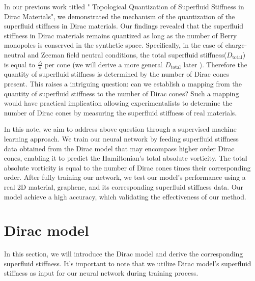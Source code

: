 \documentclass{article}
\begin{document}
In our previous work titled " Topological Quantization of Superfluid Stiffness in Dirac Materials", we demonstrated the mechanism of the quantization of the superfluid stiffness in Dirac materials. Our findings revealed that the superfluid stiffness in Dirac materials remains quantized as long as the number of Berry monopoles is conserved in the synthetic space. Specifically, in the case of charge-neutral and Zeeman field neutral conditions, the total superfluid stiffness($ D_{\textrm{total}}  $) is equal to $  \frac{\Delta}{\pi}  $  per cone (we will derive a more general $ D_{\textrm{total}} $ later ). Therefore the quantity of superfluid stiffness is determined by the number of Dirac cones present. This raises a intriguing question: can we establish a mapping from the quantity of superfluid stiffness to the number of Dirac cones? Such a mapping would have practical implication allowing experimentalists to determine the number of Dirac cones by measuring the superfluid stiffness of real materials.

In this note, we aim to address above question through a supervised machine learning approach. We train our neural network by feeding superfluid stiffness data obtained from the Dirac model that may encompass higher order Dirac cones, enabling it to predict the Hamiltonian's total absolute vorticity. The total absolute vorticity is equal to the number of Dirac cones times their corresponding order.  After fully training our network, we test our model's performance using a real 2D material, graphene, and its corresponding superfluid stiffness data. Our model achieve a high accuracy, which validating the effectiveness of our method.

\section{Dirac model}
In this section, we will introduce the Dirac model and derive the corresponding superfluid stiffness. It's important to note that we utilize Dirac model's superfluid stiffness as input for our neural network during training process.
\end{document}

